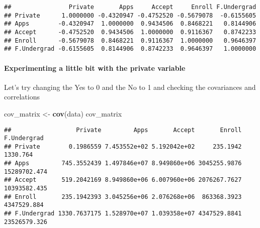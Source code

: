 \documentclass[]{article}
\newenvironment{Shaded}{\begin{snugshade}}{\end{snugshade}}
\newcommand{\DecValTok}[1]{\textcolor[rgb]{0.00,0.00,0.81}{#1}}
\newcommand{\KeywordTok}[1]{\textcolor[rgb]{0.13,0.29,0.53}{\textbf{#1}}}
\newcommand{\NormalTok}[1]{#1}
\newcommand{\OperatorTok}[1]{\textcolor[rgb]{0.81,0.36,0.00}{\textbf{#1}}}
\newcommand{\StringTok}[1]{\textcolor[rgb]{0.31,0.60,0.02}{#1}}
\let\oldparagraph\paragraph
\renewcommand{\paragraph}[1]{\oldparagraph{#1}\mbox{}}
\begin{document}
\begin{verbatim}
##                Private       Apps     Accept     Enroll F.Undergrad
## Private      1.0000000 -0.4320947 -0.4752520 -0.5679078  -0.6155605
## Apps        -0.4320947  1.0000000  0.9434506  0.8468221   0.8144906
## Accept      -0.4752520  0.9434506  1.0000000  0.9116367   0.8742233
## Enroll      -0.5679078  0.8468221  0.9116367  1.0000000   0.9646397
## F.Undergrad -0.6155605  0.8144906  0.8742233  0.9646397   1.0000000
\end{verbatim}

\hypertarget{experimenting-a-little-bit-with-the-private-variable}{%
\paragraph{Experimenting a little bit with the private
variable}\label{experimenting-a-little-bit-with-the-private-variable}}

Let's try changing the Yes to 0 and the No to 1 and checking the
covariances and correlations

\begin{Shaded}
\end{Shaded}

\begin{Shaded}
\begin{Highlighting}[]
\NormalTok{cov_matrix <-}\StringTok{ }\KeywordTok{cov}\NormalTok{(data)}
\NormalTok{cov_matrix}
\end{Highlighting}
\end{Shaded}

\begin{verbatim}
##                  Private         Apps       Accept       Enroll  F.Undergrad
## Private        0.1986559 7.453552e+02 5.192042e+02     235.1942     1330.764
## Apps         745.3552439 1.497846e+07 8.949860e+06 3045255.9876 15289702.474
## Accept       519.2042169 8.949860e+06 6.007960e+06 2076267.7627 10393582.435
## Enroll       235.1942393 3.045256e+06 2.076268e+06  863368.3923  4347529.884
## F.Undergrad 1330.7637175 1.528970e+07 1.039358e+07 4347529.8841 23526579.326
\end{verbatim}
\end{document}
